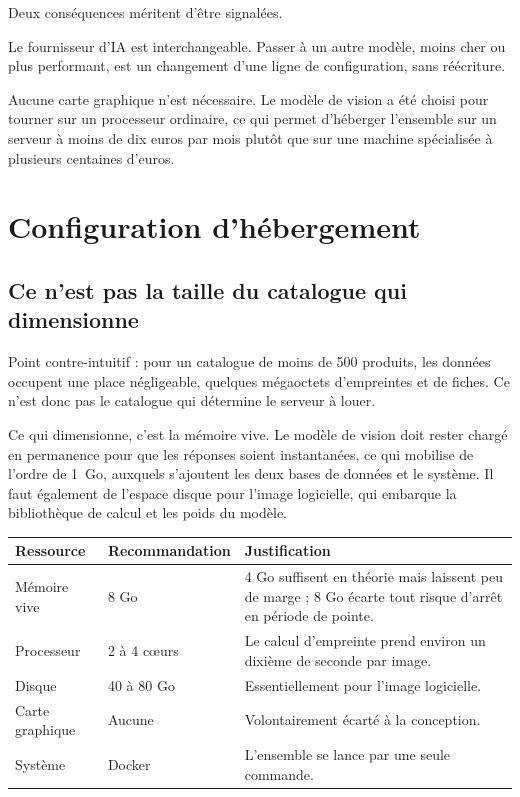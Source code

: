\documentclass[11pt,a4paper]{article}
\begin{document}
\vspace{1em}
Deux conséquences méritent d'être signalées.

Le fournisseur d'IA est interchangeable. Passer à un autre modèle, moins cher ou
plus performant, est un changement d'une ligne de configuration, sans
réécriture.

Aucune carte graphique n'est nécessaire. Le modèle de vision a été choisi pour
tourner sur un processeur ordinaire, ce qui permet d'héberger l'ensemble sur un
serveur à moins de dix euros par mois plutôt que sur une machine spécialisée à
plusieurs centaines d'euros.

\section{Configuration d'hébergement}

\subsection{Ce n'est pas la taille du catalogue qui dimensionne}

Point contre-intuitif : pour un catalogue de moins de 500 produits, les données
occupent une place négligeable, quelques mégaoctets d'empreintes et de fiches.
Ce n'est donc pas le catalogue qui détermine le serveur à louer.

Ce qui dimensionne, c'est la mémoire vive. Le modèle de vision doit rester
chargé en permanence pour que les réponses soient instantanées, ce qui mobilise
de l'ordre de 1~Go, auxquels s'ajoutent les deux bases de données et le système.
Il faut également de l'espace disque pour l'image logicielle, qui embarque la
bibliothèque de calcul et les poids du modèle.

\vspace{0.6em}
\begin{tabularx}{\textwidth}{L{3.8cm} L{3.2cm} X}
\toprule
\textbf{Ressource} & \textbf{Recommandation} & \textbf{Justification} \\
\midrule
Mémoire vive & 8 Go & 4 Go suffisent en théorie mais laissent peu de marge ;
8 Go écarte tout risque d'arrêt en période de pointe. \\
Processeur & 2 à 4 cœurs & Le calcul d'empreinte prend environ un dixième de
seconde par image. \\
Disque & 40 à 80 Go & Essentiellement pour l'image logicielle. \\
Carte graphique & Aucune & Volontairement écarté à la conception. \\
Système & Docker & L'ensemble se lance par une seule commande. \\
\bottomrule
\end{tabularx}
\end{document}

